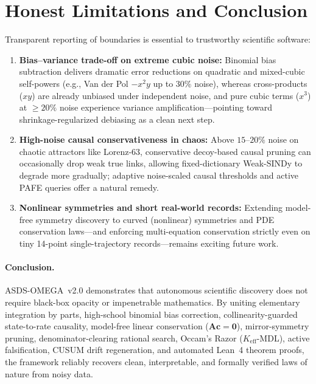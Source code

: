 \documentclass[11pt,a4paper]{article}
\begin{document}
\section{Honest Limitations and Conclusion}
Transparent reporting of boundaries is essential to trustworthy scientific software:
\begin{enumerate}
  \item \textbf{Bias--variance trade-off on extreme cubic noise:} Binomial bias subtraction delivers dramatic error reductions on quadratic and mixed-cubic self-powers (e.g., Van der Pol $-x^2 y$ up to 30\% noise), whereas cross-products ($xy$) are already unbiased under independent noise, and pure cubic terms ($x^3$) at $\ge 20\%$ noise experience variance amplification—pointing toward shrinkage-regularized debiasing as a clean next step.
  \item \textbf{High-noise causal conservativeness in chaos:} Above $15\text{--}20\%$ noise on chaotic attractors like Lorenz-63, conservative decoy-based causal pruning can occasionally drop weak true links, allowing fixed-dictionary Weak-SINDy to degrade more gradually; adaptive noise-scaled causal thresholds and active PAFE queries offer a natural remedy.
  \item \textbf{Nonlinear symmetries and short real-world records:} Extending model-free symmetry discovery to curved (nonlinear) symmetries and PDE conservation laws—and enforcing multi-equation conservation strictly even on tiny 14-point single-trajectory records—remains exciting future work.
\end{enumerate}

\paragraph{Conclusion.}
ASDS-OMEGA~v2.0 demonstrates that autonomous scientific discovery does not require black-box opacity or impenetrable mathematics. By uniting elementary integration by parts, high-school binomial bias correction, collinearity-guarded state-to-rate causality, model-free linear conservation ($\mathbf{A}\mathbf{c}=\mathbf{0}$), mirror-symmetry pruning, denominator-clearing rational search, Occam's Razor ($K_{\text{eff}}$-MDL), active falsification, CUSUM drift regeneration, and automated Lean~4 theorem proofs, the framework reliably recovers clean, interpretable, and formally verified laws of nature from noisy data.

\clearpage


\end{document}
